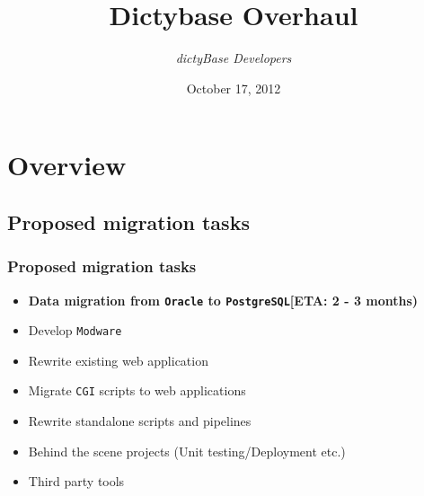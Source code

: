 \documentclass[hyperref={pdfpagelabels=false}, compress]{beamer}
\title{Dictybase Overhaul}
\author{\textit{dictyBase Developers}}
\date{October 17, 2012}
\begin{document}
\frame{\titlepage}

\frame{\tableofcontents}


\section{Overview}

\subsection{Proposed migration tasks}
\begin{frame}
	\frametitle{Proposed migration tasks}
	
    	\begin{itemize}
		\item \textbf{Data migration from \texttt{Oracle} to \texttt{PostgreSQL}\newline [ETA: 2 - 3 months)}
    		\item Develop \texttt{Modware}
    		\item Rewrite existing web application
    		\item Migrate \texttt{CGI} scripts to web applications 
    		\item Rewrite standalone scripts and pipelines
    		\item Behind the scene projects (Unit testing/Deployment etc.)
    		\item Third party tools
	\end{itemize}
\end{frame}
\end{document}
